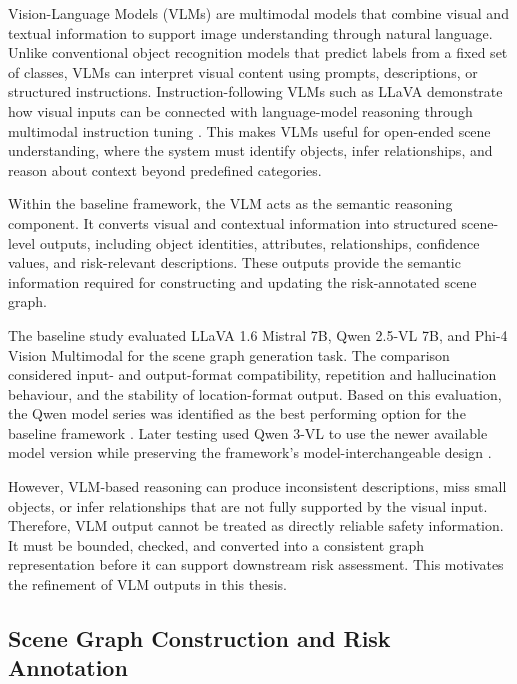 {\small

Vision-Language Models (VLMs) are multimodal models that combine visual and textual information to support image understanding through natural language. Unlike conventional object recognition models that predict labels from a fixed set of classes, VLMs can interpret visual content using prompts, descriptions, or structured instructions. Instruction-following VLMs such as LLaVA demonstrate how visual inputs can be connected with language-model reasoning through multimodal instruction tuning \cite{liu2023llava}. This makes VLMs useful for open-ended scene understanding, where the system must identify objects, infer relationships, and reason about context beyond predefined categories.

Within the baseline framework, the VLM acts as the semantic reasoning component. It converts visual and contextual information into structured scene-level outputs, including object identities, attributes, relationships, confidence values, and risk-relevant descriptions. These outputs provide the semantic information required for constructing and updating the risk-annotated scene graph.

The baseline study evaluated LLaVA 1.6 Mistral 7B, Qwen 2.5-VL 7B, and Phi-4 Vision Multimodal for the scene graph generation task. The comparison considered input- and output-format compatibility, repetition and hallucination behaviour, and the stability of location-format output. Based on this evaluation, the Qwen model series was identified as the best performing option for the baseline framework \cite{previous_rsg_thesis}. Later testing used Qwen 3-VL to use the newer available model version while preserving the framework's model-interchangeable design \cite{previous_rsg_thesis}.

However, VLM-based reasoning can produce inconsistent descriptions, miss small objects, or infer relationships that are not fully supported by the visual input. Therefore, VLM output cannot be treated as directly reliable safety information. It must be bounded, checked, and converted into a consistent graph representation before it can support downstream risk assessment. This motivates the refinement of VLM outputs in this thesis.

}

\subsection{Scene Graph Construction and Risk Annotation}

